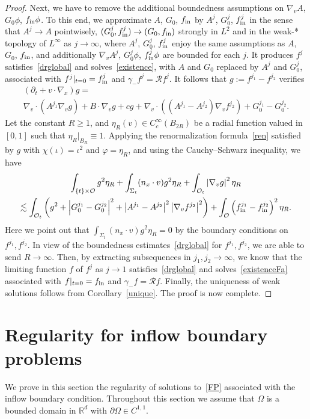 \documentclass[AHL,Unicode,longabstracts,published]{cedram}
\newcommand*\p{\partial}
\newcommand*\fin {f_{\rm in}}
\newcommand*\R {\mathbb{R}}
\newcommand*\RR {\mathcal{R}}
\newcommand*\OO {\mathcal{O}}
\begin{document}
\begin{proof}
Next, we have to remove the additional boundedness assumptions on $\nabla_vA$, $G_0\phi$, $\fin\phi$. To this end, we approximate $A$, $G_0$, $\fin$ by $A^j$, $G_0^j$, $\fin^j$ in the sense that $A^j\rightarrow A$ pointwisely, $(G_0^j,\fin^j)\rightarrow (G_0,\fin)$ strongly in $L^2$ and in the weak-* topology of $L^\infty$ as $j\rightarrow\infty$, where $A^j$, $G_0^j$, $\fin^j$ enjoy the same assumptions as $A$, $G_0$, $\fin$, and additionally $\nabla_vA^j$, $G_0^j\phi$, $\fin^j\phi$ are bounded for each $j$. It produces $f^j$ satisfies~\eqref{drglobal} and solves~\eqref{existence}, with $A$ and $G_0$ replaced by $A^j$ and $G_0^j$, associated with $f^j|_{t=0}=\fin^j$ and $\gamma_-f^j=\RR f^j$. It follows that $g:=f^{j_1}-f^{j_2}$ verifies
\begin{multline*}
\left(\p_t+v\cdot\nabla_x\right)g =\\ \nabla_v\cdot\left(A^{j_1}\nabla_vg\right) +B\cdot\nabla_vg +cg
+ \nabla_v\cdot\left(\left(A^{j_1}-A^{j_2}\right)\nabla_vf^{j_2}\right) +G_0^{j_1}-G_0^{j_2}.
\end{multline*}
Let the constant $R\ge1$, and $\eta_R(v)\in C_c^\infty(B_{2R})$ be a radial function valued in $[0,1]$ such that $\eta_R|_{B_R}\equiv1$. Applying the renormalization formula~\eqref{ren} satisfied by $g$ with $\chi(\iota)=\iota^2$ and $\varphi=\eta_R$, and using the Cauchy--Schwarz inequality, we have
\begin{multline*}
\int_{\{t\}\times\OO} g^2 \eta_R + \int_{\Sigma_t}(n_x\cdot v) g^2\eta_R +\int_{\OO_t}\left|\nabla_vg\right|^2\eta_R\\
\lesssim \int_{\OO_t} \left(g^2+\left|G_0^{j_1}-G_0^{j_2}\right|^2 + \left|A^{j_1}-A^{j_2}\right|^2\left|\nabla_vf^{j_2}\right|^2 \right) + \int_\OO \left(\fin^{j_1}-\fin^{j_2}\right)^2 \eta_R.
\end{multline*}
Here we point out that $\int_{\Sigma_t}(n_x\cdot v) g^2\eta_R=0$ by the boundary conditions on $f^{j_1},f^{j_2}$. In view of the boundedness estimates~\eqref{drglobal} for $f^{j_1},f^{j_2}$, we are able to send $R\rightarrow\infty$. Then, by extracting subsequences in $j_1,j_2\rightarrow\infty$, we know that the limiting function $f$ of $f^j$ as $j\rightarrow1$ satisfies~\eqref{drglobal} and solves~\eqref{existenceFa} associated with $f|_{t=0}=\fin$ and $\gamma_-f=\RR f$. Finally, the uniqueness of weak solutions follows from Corollary~\ref{unique}. The proof is now complete.
\end{proof}

\section{Regularity for inflow boundary problems}\label{inflow}
We prove in this section the regularity of solutions to~\eqref{FP} associated with the inflow boundary condition. Throughout this section we assume that $\Omega$ is a bounded domain in $\R^d$ with $\p\Omega\in C^{1,1}$.
\end{document}
